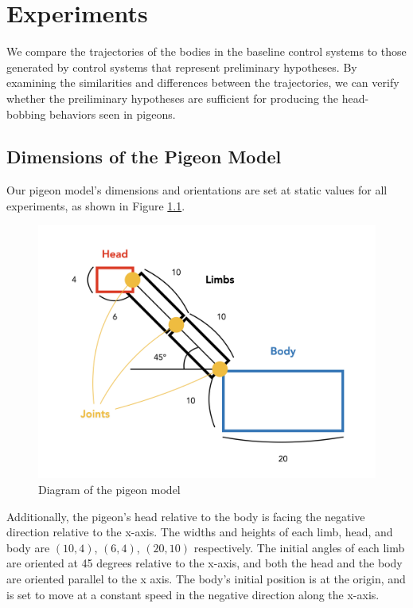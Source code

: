 \chapter{Experiments}
We compare the trajectories of the bodies in the baseline control systems to those generated by control systems that represent preliminary hypotheses. By examining the similarities and differences between the trajectories, we can verify whether the preiliminary hypotheses are sufficient for producing the head-bobbing behaviors seen in pigeons.

\section{Dimensions of the Pigeon Model}
  Our pigeon model's dimensions and orientations are set at static values for all experiments, as shown in Figure \ref{fig:pigeon_dimension}.
    \begin{figure}[H]
        \centering
        \includegraphics[width=1\textwidth]{figures/pigeon_diagram/pigeon_diagram_001.png}
        \caption{Diagram of the pigeon model}
        \label{fig:pigeon_dimension}
    \end{figure}
  Additionally, the pigeon's head relative to the body is facing the negative direction relative to the x-axis.
  The widths and heights of each limb, head, and body are $(10, 4)$, $(6, 4)$, $(20, 10)$ respectively.
  The initial angles of each limb are oriented at 45 degrees relative to the x-axis, and both the head and the body are oriented parallel to the x axis.
  The body's initial position is at the origin, and is set to move at a constant speed in the negative direction along the x-axis.

